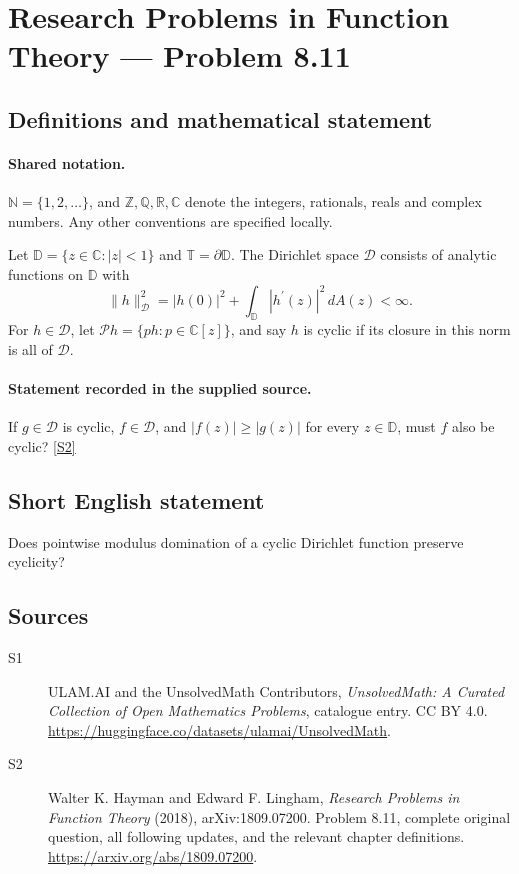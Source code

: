 \documentclass[11pt]{book}
\newcommand{\sref}[2]{\hyperlink{source:#1:#2}{[S#2]}}
\begin{document}
\section{Research Problems in Function Theory — Problem 8.11}\label{statement}

\subsection{Definitions and mathematical statement}

\paragraph{Shared notation.}$\mathbb N=\{1,2,\ldots\}$, and $\mathbb Z,\mathbb Q,\mathbb R,\mathbb C$ denote the integers, rationals, reals and complex numbers. Any other conventions are specified locally.


Let $\mathbb D=\{z\in\mathbb C:|z|<1\}$ and $\mathbb T=\partial\mathbb D$. The Dirichlet space $\mathcal D$ consists of analytic functions on $\mathbb D$ with \[\|h\|_{\mathcal D}^2=|h(0)|^2+\int_{\mathbb D}|h^{\prime}(z)|^2\,dA(z)<\infty.\] For $h\in\mathcal D$, let $\mathcal Ph=\{ph:p\in\mathbb C[z]\}$, and say $h$ is cyclic if its closure in this norm is all of $\mathcal D$.
\paragraph{Statement recorded in the supplied source.}
If $g\in\mathcal D$ is cyclic, $f\in\mathcal D$, and $|f(z)|\ge|g(z)|$ for every $z\in\mathbb D$, must $f$ also be cyclic? \sref{statement}{2}
\subsection{Short English statement}
Does pointwise modulus domination of a cyclic Dirichlet function preserve cyclicity?
\subsection{Sources}
\begin{description}
\item[\hypertarget{source:statement:1}{S1}] ULAM.AI and the UnsolvedMath Contributors, \emph{UnsolvedMath: A Curated Collection of Open Mathematics Problems}, catalogue entry. CC BY 4.0. \url{https://huggingface.co/datasets/ulamai/UnsolvedMath}.
\item[\hypertarget{source:statement:2}{S2}] Walter K. Hayman and Edward F. Lingham, \emph{Research Problems in Function Theory} (2018), arXiv:1809.07200. Problem 8.11, complete original question, all following updates, and the relevant chapter definitions. \url{https://arxiv.org/abs/1809.07200}.
\end{description}
\label{end:statement}
\end{document}
